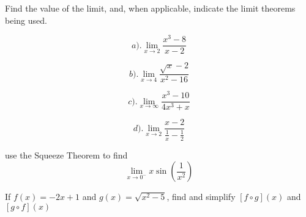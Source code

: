 \documentclass[11pt]{exam}
\begin{document}
\begin{questions}
\vfill









\addpoints
\question[24] 
Find the value of the limit, and, when applicable, indicate the limit theorems being used.  %

\begin{minipage}{.3\linewidth}
\begin{equation*}
a).   \lim_{x\to 2} \frac{x^{3}-8}{x-2}
\end{equation*}
\end{minipage}%
\begin{minipage}{.7\linewidth}
\begin{equation*}
b).   \lim_{x\to 4} \frac{\sqrt{x}-2}{x^{2}-16}
\end{equation*}
\end{minipage}

\vfill\vfill

\begin{minipage}{.3\linewidth}
\begin{equation*}
c).   \lim_{x\to \infty} \frac{x^{3}-10}{4x^{3}+x}
\end{equation*}
\end{minipage}%
\begin{minipage}{.7\linewidth}
\begin{equation*}
d).   \lim_{x\to 2} \frac{x-2}{\frac{1}{x}-\frac{1}{2}}
\end{equation*}
\end{minipage}

\vfill\vfill











\newpage
\addpoints
\question[10] use the Squeeze Theorem to find 
\[ 
\lim_{x\to 0^{-}} x\sin{\left(\frac{1}{x^{2}}\right)}
\]
\vfill

\question[10] If $f(x)=-2x+1$ and $g(x)=\sqrt{x^{2}-5}$, find and simplify $\left[f\circ g\right](x)$ and $\left[g\circ f\right](x)$

\vfill


\end{questions}
\end{document}
